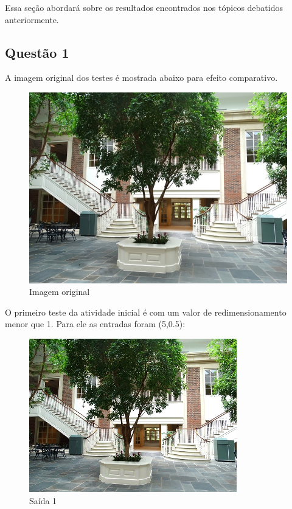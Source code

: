 \documentclass[conference]{IEEEtran}
\begin{document}
Essa seção abordará sobre os resultados encontrados nos tópicos debatidos
anteriormente.

\subsection{Questão 1}

A imagem original dos testes é mostrada abaixo para efeito comparativo.

\begin{figure}[h]
    \centering
    \includegraphics[scale=0.3]{im1.jpg}
    \caption{Imagem original}
    \label{fig1}
\end{figure}

O primeiro teste da atividade inicial é com um valor de redimensionamento
menor que 1. Para ele as entradas foram (5,0.5):

\begin{figure}[h]
    \centering
    \includegraphics[scale=0.7]{Figs/saida1.png}
    \caption{Saída 1}
    \label{fig1}
\end{figure}
\end{document}
